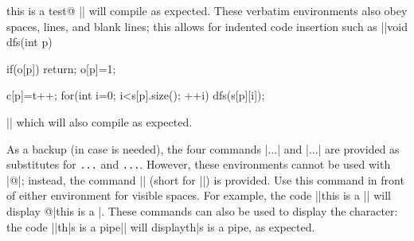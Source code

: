 this is a test@
\bye||
will compile as expected.
These verbatim environments also obey spaces, lines, and blank lines; this allows for indented code insertion such as
||void dfs(int p){
    if(o[p]) return;
    o[p]=1;
    
    c[p]=t++;
    for(int i=0; i<s[p].size(); ++i){
        dfs(s[p][i]);
    }
}||
which will also compile as expected.

As a backup (in case {\tt\pipe} is needed), the four commands |\bverb...\everb| and |\bverbatim...\everbatim| are provided as substitutes for {\tt\pipe...\pipe} and {\tt\pipe\pipe...\pipe\pipe}. However, these environments cannot be used with |@|; instead, the command |\svs| (short for |\showverbspaces|) is provided. Use this command in front of either environment for visible spaces. For example, the code
||\svs\bverb this is a \test\everb||
will display @|this is a \test|. These commands can also be used to display the {\tt\pipe} character: the code
||\bverb th|s is a pipe\everb||
will display\bverb th|s is a pipe\everb, as expected.

\bye